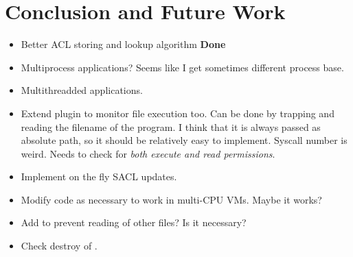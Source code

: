 
\chapter{Conclusion and Future Work}\label{ch:chapter5}

\begin{itemize}
	\item Better \ac{ACL} storing and lookup algorithm \textbf{Done}
	\item Multiprocess applications? Seems like I get sometimes different process base.
	\item Multithreadded applications. 
	\item Extend plugin to monitor file execution too. Can be done by trapping  and reading the filename of the program. I think that it is always passed as absolute path, so it should be relatively easy to implement. Syscall number is weird. Needs to check for \emph{both execute and read permissions}.
	\item Implement on the fly \ac{SACL} updates. 
	\item Modify code as necessary to work in multi-CPU \acp{VM}. Maybe it works?
	\item Add  to prevent reading of other files? Is it necessary?
	\item Check destroy of .
\end{itemize}

